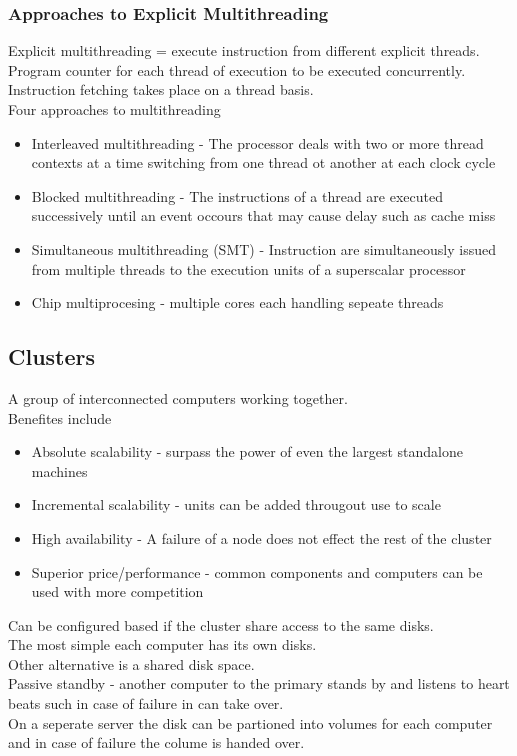 \documentclass[12pt, a4paper]{article}
\begin{document}
			\subsubsection{Approaches to Explicit Multithreading}
				Explicit multithreading = execute instruction from different explicit threads.\\
				Program counter for each thread of execution to be executed concurrently.\\
				Instruction fetching takes place on a thread basis.\\
				Four approaches to multithreading
				\begin{itemize}
					\item Interleaved multithreading - The processor deals with two or more thread contexts at a time switching from one thread ot another at each clock cycle
					\item Blocked multithreading - The instructions of a thread are executed successively until an event occours that may cause delay such as cache miss
					\item Simultaneous multithreading (SMT) - Instruction are simultaneously issued from multiple threads to the execution units of a superscalar processor
					\item Chip multiprocesing - multiple cores each handling sepeate threads
				\end{itemize}
		\subsection{Clusters}
			 A group of interconnected computers working together.\\
			 Benefites include
			 \begin{itemize}
			 	\item Absolute scalability - surpass the power of even the largest standalone machines
			 	\item Incremental scalability - units can be added througout use to scale
			 	\item High availability - A failure of a node does not effect the rest of the cluster
			 	\item Superior price/performance - common components and computers can be used with more competition
			\end{itemize}
			Can be configured based if the cluster share access to the same disks.\\
			The most simple each computer has its own disks.\\
			Other alternative is a shared disk space.\\
			Passive standby - another computer to the primary stands by and listens to heart beats such in case of failure in can take over.\\
			On a seperate server the disk can be partioned into volumes for each computer and in case of failure the colume is handed over.
\end{document}
